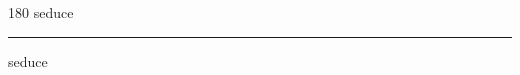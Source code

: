
\begin{frame}
\begin{center}
\begin{turn}{180}
{\fontsize{2.5cm}{1em}\selectfont seduce}
\end{turn}
\vspace{1em}\par  
\hrule
\vspace{1em}\par  
{\fontsize{2.5cm}{1em}\selectfont seduce}
\end{center}
\end{frame}
